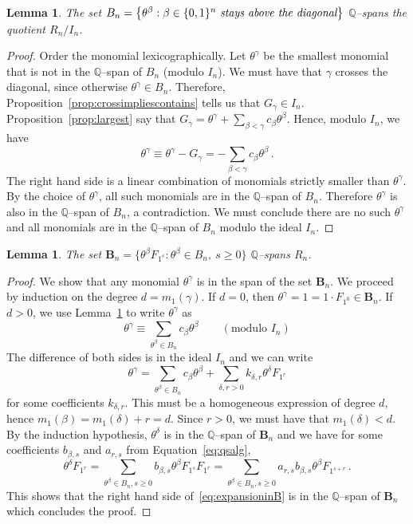 \documentclass[11pt]{amsart}
\newtheorem{lemma}[theorem]{Lemma}
\theoremstyle{definition}
\numberwithin{equation}{section}
\begin{document}
\begin{lemma}\label{lem:spanofquotient}
The set $B_n=\big\{ \theta^\beta : \beta \in \{0,1\}^n \text{ \it stays above the diagonal}\big\}$
$\mathbb Q$--spans the quotient $R_n\big/I_n$.
\end{lemma}

\begin{proof}
Order the monomial lexicographically. Let  $\theta^\gamma$ be the smallest monomial that is not in the $\mathbb Q$--span of $B_n$
(modulo  $I_n$). We must have  that $\gamma$ crosses the  diagonal, since otherwise $\theta^\gamma\in  B_n$. Therefore, Proposition~\ref{prop:crossimpliescontains}
tells us  that $G_\gamma \in I_n$. Proposition~\ref{prop:largest} say that $G_\gamma = \theta^\gamma + \sum_{\beta<\gamma}  c_\beta \theta^\beta$. Hence, modulo $I_n$, we have
$$ \theta^\gamma \equiv \theta^\gamma - G_\gamma = - \sum_{\beta<\gamma} c_\beta \theta^\beta\,.$$
The right hand side is a linear combination of monomials strictly smaller than $\theta^\gamma$.
By the choice of $\theta^\gamma$, all such monomials are in the $\mathbb Q$--span of $B_n$.
 Therefore $\theta^\gamma$ is also in the $\mathbb Q$--span of $B_n$, a contradiction. We must conclude there are no such $\theta^\gamma$ and all monomials are in the $\mathbb Q$--span of $B_n$ modulo the ideal $I_n$.
\end{proof}

\begin{lemma}\label{lem:spanofpolynomials}
 The set ${\mathbf B}_n=\big\{ \theta^\beta F_{1^s} : \theta^\beta \in B_n,\  s\ge 0\big\}$ $\mathbb Q$--spans $R_n$.
\end{lemma}

\begin{proof}
We show that any monomial $\theta^\gamma$ is in the span of the set ${\mathbf B}_n$.
We proceed by induction on the degree $d=m_1(\gamma)$. If $d=0$, then $\theta^\gamma = 1 = 1\cdot F_{1^0} \in {\mathbf B}_n$.
If $d>0$, we use Lemma~\ref{lem:spanofquotient} to write $\theta^\gamma$ as
$$ \theta^\gamma \equiv \sum_{\theta^\beta\in B_n}  c_\beta \theta^\beta\qquad (\text{modulo $I_n$})$$
The difference of both sides is in the ideal $I_n$ and we can write
\begin{equation}\label{eq:expansioninB}
\theta^\gamma = \sum_{\theta^\beta\in B_n}  c_\beta \theta^\beta
+ \sum_{\delta, r>0} k_{\delta,r} \theta^\delta F_{1^r}
\end{equation}
for some coefficients $k_{\delta,r}$.
This must be a homogeneous expression of degree $d$, hence $m_1(\beta) = m_1(\delta) + r = d$.
Since $r>0$, we must have that $m_1(\delta)<d$. By the induction hypothesis,
$\theta^\delta$ is in the $\mathbb Q$--span of ${\mathbf B}_n$ and we have
for some coefficients $b_{\beta,s}$ and $a_{r,s}$ from Equation~\eqref{eq:qsalg},
$$\theta^\delta F_{1^r} = \sum_{\theta^\beta\in B_n, s\ge 0} b_{\beta,s} \theta^\beta F_{1^s} F_{1^r} =  \sum_{\theta^\beta\in B_n, s\ge 0} a_{r,s} b_{\beta,s} \theta^\beta F_{1^{s+r}} \,.$$
This shows that the right hand side of~\eqref{eq:expansioninB}
is in the $\mathbb Q$--span of ${\mathbf B}_n$ which concludes the proof.
\end{proof}
\end{document}
